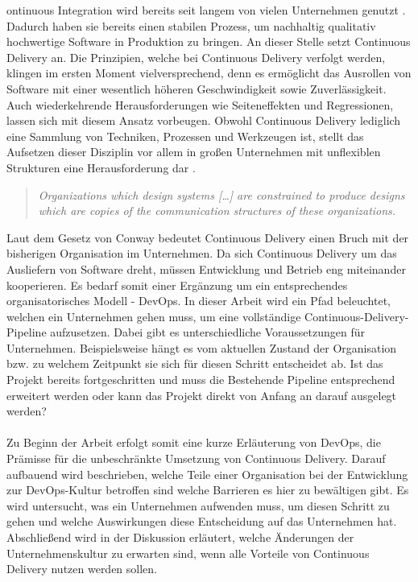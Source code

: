ontinuous Integration wird bereits seit langem von vielen Unternehmen genutzt \cite{automic.2017}. Dadurch haben sie bereits einen stabilen Prozess, um nachhaltig qualitativ hochwertige Software in Produktion zu bringen. An dieser Stelle setzt Continuous Delivery an. Die Prinzipien, welche bei Continuous Delivery verfolgt werden, klingen im ersten Moment vielversprechend, denn es ermöglicht das Ausrollen von Software mit einer wesentlich höheren Geschwindigkeit sowie Zuverlässigkeit. Auch wiederkehrende Herausforderungen wie Seiteneffekten und Regressionen, lassen sich mit diesem Ansatz vorbeugen. Obwohl Continuous Delivery lediglich eine Sammlung von Techniken, Prozessen und Werkzeugen ist, stellt das Aufsetzen dieser Disziplin vor allem in großen Unternehmen mit unflexiblen Strukturen eine Herausforderung dar \cite{Wolff.2016}. 
\begin{quote} \textit{\glqq Organizations which design systems […] are constrained to produce designs which are copies of the communication structures of these organizations. \grqq~}\cite[S.4]{convay.1968} \end{quote} 

Laut dem Gesetz von Conway bedeutet Continuous Delivery einen Bruch mit der bisherigen Organisation im Unternehmen. Da sich Continuous Delivery um das Ausliefern von Software dreht, müssen Entwicklung und Betrieb eng miteinander kooperieren. Es bedarf somit einer Ergänzung um ein entsprechendes organisatorisches Modell - DevOps. In dieser Arbeit wird ein Pfad beleuchtet, welchen ein Unternehmen gehen muss, um eine vollständige Continuous-Delivery-Pipeline aufzusetzen. Dabei gibt es unterschiedliche Voraussetzungen für Unternehmen. Beispielsweise hängt es vom aktuellen Zustand der Organisation bzw. zu welchem Zeitpunkt sie sich für diesen Schritt entscheidet ab. Ist das Projekt bereits fortgeschritten und muss die Bestehende Pipeline entsprechend erweitert werden oder kann das Projekt direkt von Anfang an darauf ausgelegt werden?
\\ \\ Zu Beginn der Arbeit erfolgt somit eine kurze Erläuterung von DevOps, die Prämisse für die unbeschränkte Umsetzung von Continuous Delivery. Darauf aufbauend wird beschrieben, welche Teile einer Organisation bei der Entwicklung zur DevOps-Kultur betroffen sind welche Barrieren es hier zu bewältigen gibt. Es wird untersucht, was ein Unternehmen aufwenden muss, um diesen Schritt zu gehen und welche Auswirkungen diese Entscheidung auf das Unternehmen hat. Abschließend wird in der Diskussion erläutert, welche Änderungen der Unternehmenskultur zu erwarten sind, wenn alle Vorteile von Continuous Delivery nutzen werden sollen.